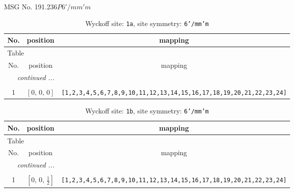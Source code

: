 \documentclass[fleqn,8pt]{jsarticle}
\begin{document}
\setcounter{MaxMatrixCols}{32}

\renewcommand{\tablename}{Table~}
\renewcommand{\figurename}{Figure~}
\begin{center}
\LARGE
MSG No. 191.236\quad$P6'/mm'm$
\end{center}
\renewcommand{\arraystretch}{1.2}
\begin{longtable}{ccc}
\caption{Wyckoff site: {\tt 1a}, site symmetry: {\tt 6'/mm'm}}
 \\
 \hline \hline
No. & position & mapping \\ \hline \endfirsthead

\multicolumn{2}{l}{\tablename\ \thetable{}} \\
 \hline \hline
No. & position & mapping \\ \hline \endhead

 \hline \hline
\multicolumn{2}{r}{\footnotesize\it continued ...} \\ \endfoot

 \hline \hline
\multicolumn{2}{r}{} \\ \endlastfoot

1 & $\left[ 0,\, 0,\, 0 \right]$ & {\tt [1,2,3,4,5,6,7,8,9,10,11,12,13,14,15,16,17,18,19,20,21,22,23,24]} \\
\end{longtable}
\renewcommand{\arraystretch}{1.2}
\begin{longtable}{ccc}
\caption{Wyckoff site: {\tt 1b}, site symmetry: {\tt 6'/mm'm}}
 \\
 \hline \hline
No. & position & mapping \\ \hline \endfirsthead

\multicolumn{2}{l}{\tablename\ \thetable{}} \\
 \hline \hline
No. & position & mapping \\ \hline \endhead

 \hline \hline
\multicolumn{2}{r}{\footnotesize\it continued ...} \\ \endfoot

 \hline \hline
\multicolumn{2}{r}{} \\ \endlastfoot

1 & $\left[ 0,\, 0,\, \frac{1}{2} \right]$ & {\tt [1,2,3,4,5,6,7,8,9,10,11,12,13,14,15,16,17,18,19,20,21,22,23,24]} \\
\end{longtable}
\renewcommand{\arraystretch}{1.2}
\end{document}
